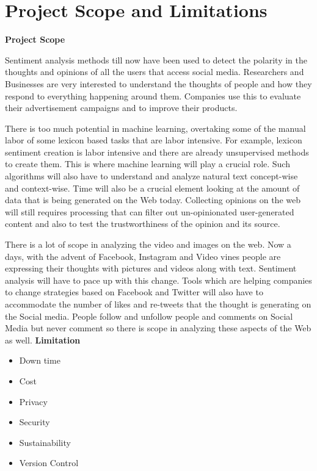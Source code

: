 \documentclass[oneside,a4paper,12pt]{book}
\begin{document}
\section{Project Scope and Limitations}
\textbf{Project Scope}

Sentiment analysis methods till now have been used to detect the polarity in the thoughts and opinions of all the users that access social media. Researchers and Businesses are very interested to understand the thoughts of people and how they respond to everything happening around them. Companies use this to evaluate their advertisement campaigns and to improve their products. \par
There is too much potential in machine learning, overtaking some of the manual labor of some lexicon based tasks that are labor intensive. For example, lexicon sentiment creation is labor intensive and there are already unsupervised methods to create them. This is where machine learning will play a crucial role. Such algorithms will also have to understand and analyze natural text concept-wise and context-wise. Time will also be a crucial element looking at the amount of data that is being generated on the Web today. Collecting opinions on the web will still requires processing that can filter out un-opinionated user-generated content and also to test the trustworthiness of the opinion and its source. \par
There is a lot of scope in analyzing the video and images on the web. Now a days, with the advent of Facebook, Instagram and Video vines people are expressing their thoughts with pictures and videos along with text. Sentiment analysis will have to pace up with this change. Tools which are helping companies to change strategies based on Facebook and Twitter will also have to accommodate the number of likes and re-tweets that the thought is generating on the Social media. People follow and unfollow people and comments on Social Media but never comment so there is scope in
analyzing these aspects of the Web as well.\newline
\textbf{Limitation}
\begin{itemize}
\item Down time
\item Cost
\item Privacy
\item Security
\item Sustainability
\item Version Control
\end{itemize}
\end{document}
